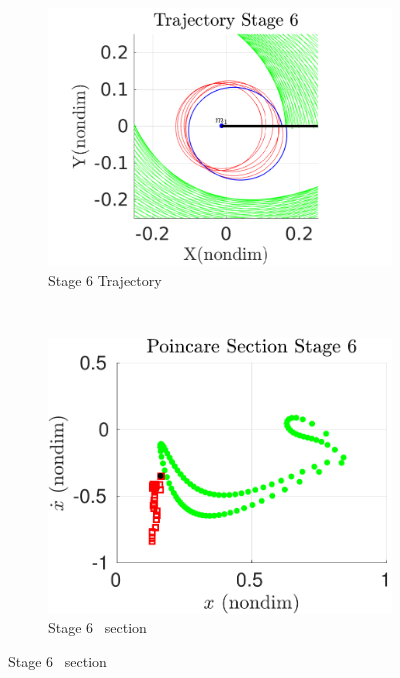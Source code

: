 \documentclass[smallcondensed]{svjour3}
\begin{document}
\begin{figure}[htbp]
    \begin{subfigure}[htbp]{0.5\textwidth} 
        \includegraphics[width=\textwidth, keepaspectratio]{figures/geo_transfer/stage6_trajectory_zoom.pdf} 
        \caption{Stage 6 Trajectory~\label{fig:stage6_trajecotry_zoom}} 
    \end{subfigure}~
    \begin{subfigure}[htbp]{0.5\textwidth} 
        \includegraphics[width=\textwidth, keepaspectratio]{figures/geo_transfer/stage6_poincare.pdf} 
        \caption{Stage 6 \Poincare~section \label{fig:stage6_poincare}} 
    \end{subfigure}


\end{figure}
\end{document}
